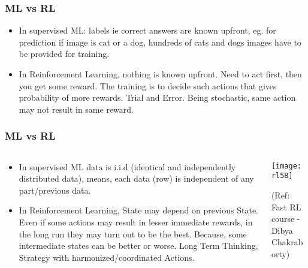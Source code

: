 \begin{frame}[fragile]\frametitle{ML vs RL}

\begin{itemize}
\item In supervised ML: labels ie correct answers are known upfront, eg. for prediction if image is cat or a dog, hundreds of cats and dogs images have to be provided for training.
\item In Reinforcement Learning,  nothing is known upfront. Need to act first, then you get some reward. The training is to decide such actions that gives probability of more rewards. Trial and Error. Being stochastic, same action may not result in same reward.
\end{itemize}
\end{frame}

\begin{frame}[fragile]\frametitle{ML vs RL}

\begin{columns}
\begin{column}{0.5\textwidth}

\begin{itemize}
\item In supervised ML data is i.i.d (identical and independently distributed data), means, each data (row) is independent of any part/previous data. 
\item In Reinforcement Learning, State may depend on previous State. Even if some actions may result in lesser immediate rewards, in the long run they may turn out to be the best. Because, some intermediate states can be better or worse. Long Term Thinking, Strategy with harmonized/coordinated Actions.
\end{itemize}

\end{column}
\begin{column}{0.5\textwidth}  %


\begin{center}
\texttt{[image: rl58]}

{\tiny (Ref: Fast RL course - Dibya Chakraborty)}

\end{center}
\end{column}
\end{columns}

\end{frame}


